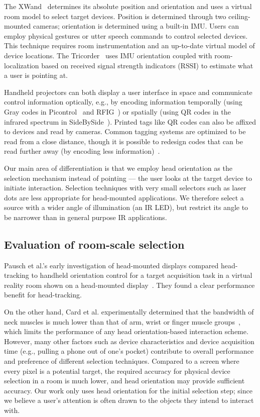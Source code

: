 The XWand~\cite{wilson_xwand:_2003} determines its absolute position and orientation and uses a virtual room model to select target devices. Position is determined through two ceiling-mounted cameras; orientation is determined using a built-in IMU. Users can employ physical gestures or utter speech commands to control selected devices. This technique requires room instrumentation and an up-to-date virtual model of device locations. The Tricorder~\cite{lifton_tricorder:_2007} uses IMU orientation coupled with room-localization based on received signal strength indicators (RSSI) to estimate what a user is pointing at.

Handheld projectors can both display a user interface in space and communicate control information optically, e.g., by encoding information temporally (using Gray codes in Picontrol~\cite{schmidt_picontrol:_2012} and RFIG~\cite{raskar_rfig_2004}) or spatially (using QR codes in the infrared spectrum in SideBySide~\cite{willis_sidebyside:_2011}). Printed tags like QR codes can also be affixed to devices and read by cameras. Common tagging systems are optimized to be read from a close distance, though it is possible to redesign codes that can be read further away (by encoding less information)~\cite{cross_low-cost_2012}. 

Our main area of differentiation is that we employ head orientation as the selection mechanism instead of pointing --- the user looks at the target device to initiate interaction. Selection techniques with very small selectors such as laser dots are less appropriate for head-mounted applications. We therefore select a source with a wider angle of illumination (an IR LED), but restrict its angle to be narrower than in general purpose IR applications.

\subsection{Evaluation of room-scale selection}
Pausch et al.'s early investigation of head-mounted displays compared head-tracking to handheld orientation control for a target acquisition task in a virtual reality room shown on a head-mounted display~\cite{pausch_user_1993}. They found a clear performance benefit for head-tracking.

On the other hand, Card et al. experimentally determined that the bandwidth of neck muscles is much lower than that of arm, wrist or finger muscle groups~\cite{card_morphological_1991}, which limits the performance of any head orientation-based interaction scheme. However, many other factors such as device characteristics and device acquisition time (e.g., pulling a phone out of one's pocket) contribute to overall performance and preference of different selection techniques.  Compared to a screen where every pixel is a potential target, the required accuracy for physical device selection in a room is much lower, and head orientation may provide sufficient accuracy. Our work only uses head orientation for the initial selection step; since we believe a user's attention is often drawn to the objects they intend to interact with. 

